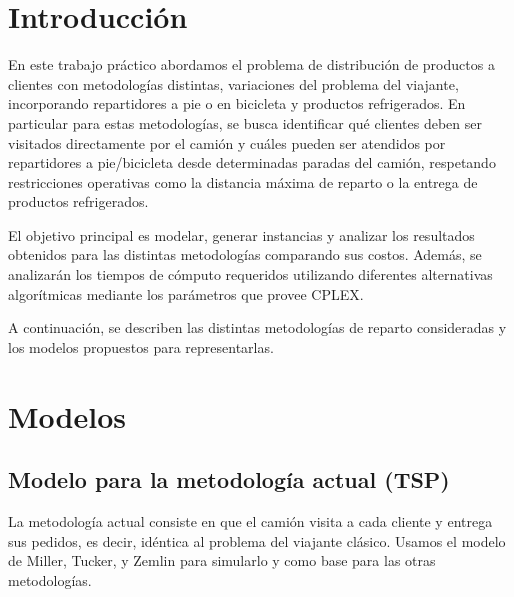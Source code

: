 \documentclass[10pt]{article}
\begin{document}

	\fecha{\today}



	\maketitle

\section{Introducción}

En este trabajo práctico abordamos el problema de distribución de productos a clientes con metodologías distintas, variaciones del problema del viajante, incorporando repartidores a pie o en bicicleta y productos refrigerados. En particular para estas metodologías, se busca identificar qué clientes deben ser visitados directamente por el camión y cuáles pueden ser atendidos por repartidores a pie/bicicleta desde determinadas paradas del camión, respetando restricciones operativas como la distancia máxima de reparto o la entrega de productos refrigerados.

El objetivo principal es modelar, generar instancias y analizar los resultados obtenidos para las distintas metodologías comparando sus costos. Además, se analizarán los tiempos de cómputo requeridos utilizando diferentes alternativas algorítmicas mediante los parámetros que provee CPLEX.

A continuación, se describen las distintas metodologías de reparto consideradas y los modelos propuestos para representarlas.
\section{Modelos}


\subsection{Modelo para la metodología actual (TSP)}

La metodología actual consiste en que el camión visita a cada cliente y entrega sus pedidos, es decir, idéntica al problema del viajante clásico. Usamos el modelo de Miller, Tucker, y Zemlin para simularlo y como base para las otras metodologías.
\end{document}
